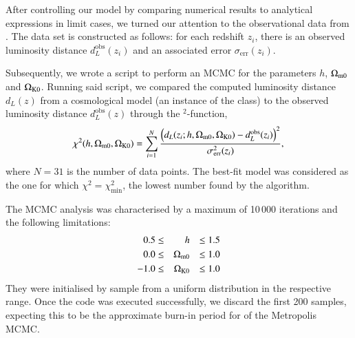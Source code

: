 After controlling our model by comparing numerical results to analytical expressions in limit cases, we turned our attention to the observational data from \citep{supernovadata}. The data set is constructed as follows: for each redshift $z_i$, there is an observed luminosity distance $d_L^\mathrm{obs}(z_i)$ and an associated error $\sigma_\mathrm{err}(z_i)$. %

Subsequently, we wrote a script to perform an MCMC for the parameters $h$, $\Omega_{\mathrm{m}0}$ and $\Omega_{\mathrm{K}0}$. Running said script, we compared the computed luminosity distance $d_L(z)$ from a cosmological model (an instance of the class) to the observed luminosity distance $d_L^\mathrm{obs}(z)$ through the \textchi$^2$-function,
\begin{equation}
    \chi^2(h, \Omega_{\mathrm{m}0}, \Omega_{\mathrm{K}0}) = \sum_{i=1}^N \frac{ \left( d_L(z_i; h, \Omega_{\mathrm{m}0}, \Omega_{\mathrm{K}0}) - d_L^\mathrm{obs}(z_i)\right)^2 }{\sigma_\mathrm{err}^2(z_i)},
\end{equation}
where $N=31$ is the number of data points. The best-fit model was considered as the one for which $\chi^2 = \chi^2_\mathrm{min}$, the lowest number found by the algorithm. %

The MCMC analysis was characterised by a maximum of 10\,000 iterations and the following limitations:
\begin{equation}\label{mil1:imp:eq:mcmc_limits}
    \begin{split}
        0.5 \leq&& h &&\leq 1.5 \\
        0.0 \leq&& \Omega_{\mathrm{m}0} &&\leq 1.0 \\
        -1.0 \leq&& \Omega_{\mathrm{K}0} &&\leq 1.0 
    \end{split}
\end{equation}
They were initialised by sample from a uniform distribution in the respective range. Once the code was executed successfully, we discard the first 200 samples, expecting this to be the approximate burn-in period for of the Metropolis MCMC.
